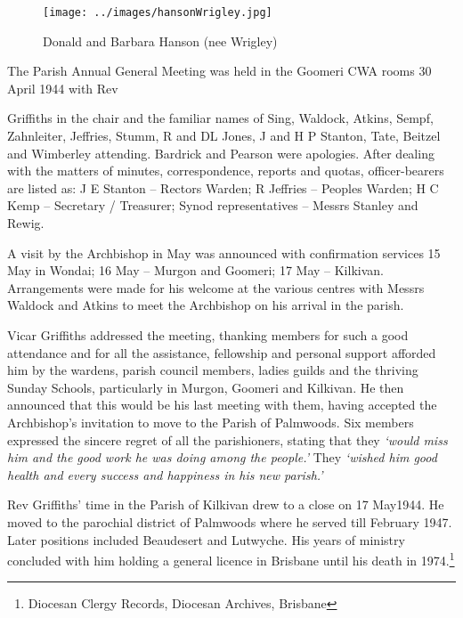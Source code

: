 \begin{figure}
\begin{center}
\texttt{[image: ../images/hansonWrigley.jpg]}
\caption{Donald and Barbara Hanson (nee Wrigley)}
\end{center}
\end{figure}




The Parish Annual General Meeting was held in the Goomeri CWA rooms 30 April 1944 with Rev



Griffiths in the chair and the familiar names of Sing, Waldock, Atkins, Sempf, Zahnleiter, Jeffries, Stumm, R and DL Jones, J and H P Stanton, Tate, Beitzel and Wimberley attending. Bardrick and Pearson were apologies. After dealing with the matters of minutes, correspondence, reports and quotas, officer-bearers are listed as: J E Stanton -- Rectors Warden; R Jeffries -- Peoples Warden; H C Kemp -- Secretary / Treasurer; Synod representatives -- Messrs Stanley and Rewig.



A visit by the Archbishop in May was announced with confirmation services 15 May in Wondai; 16 May -- Murgon and Goomeri; 17 May -- Kilkivan. Arrangements were made for his welcome at the various centres with Messrs Waldock and Atkins to meet the Archbishop on his arrival in the parish.



Vicar Griffiths addressed the meeting, thanking members for such a good attendance and for all the assistance, fellowship and personal support afforded him by the wardens, parish council members, ladies guilds and the thriving Sunday Schools, particularly in Murgon, Goomeri and Kilkivan. He then announced that this would be his last meeting with them, having accepted the Archbishop's invitation to move to the Parish of Palmwoods. Six members expressed the sincere regret of all the parishioners, stating that they \emph{`would miss him and the good work he was doing among the people.'} They \emph{`wished him good health and every success and happiness in his new parish.'}



Rev Griffiths' time in the Parish of Kilkivan drew to a close on 17 May1944. He moved to the parochial district of Palmwoods where he served till February 1947. Later positions included Beaudesert and Lutwyche. His years of ministry concluded with him holding a general licence in Brisbane until his death in 1974.\footnote{Diocesan Clergy Records, Diocesan Archives, Brisbane}


